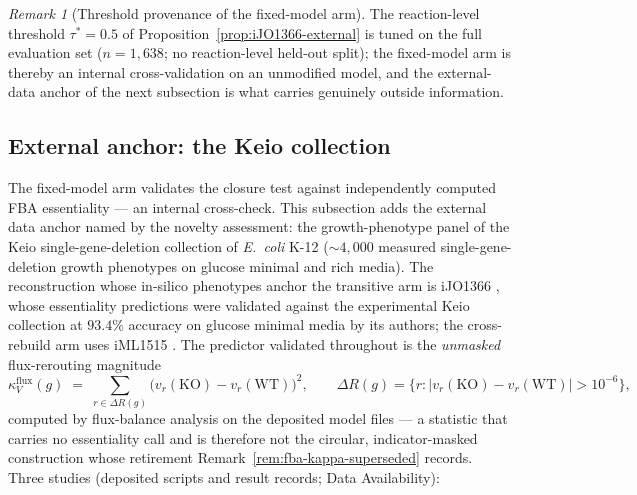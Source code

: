 \documentclass[11pt,a4paper]{article}
\theoremstyle{plain}
\theoremstyle{definition}
\theoremstyle{remark}
\newtheorem{remark}[theorem]{Remark}
\begin{document}
\begin{remark}[Threshold provenance of the fixed-model arm]
\label{rem:ijo-threshold}
The reaction-level threshold $\tau^{*}=0.5$ of
Proposition~\ref{prop:iJO1366-external} is tuned on the full
evaluation set ($n=1{,}638$; no reaction-level held-out split);
the fixed-model arm is thereby an internal cross-validation on an
unmodified model, and the external-data anchor of the next
subsection is what carries genuinely outside information.
\end{remark}

\subsection{External anchor: the Keio collection}\label{sec:network-keio}

The fixed-model arm validates the closure test against independently
computed FBA essentiality --- an internal cross-check. This
subsection adds the external data anchor named by the novelty
assessment: the growth-phenotype panel of the Keio
single-gene-deletion collection of \emph{E.~coli} K-12
\citep{baba2006keio} ($\sim4{,}000$ measured single-gene-deletion
growth phenotypes on glucose minimal and rich media). The
reconstruction whose in-silico phenotypes anchor the transitive arm
is iJO1366 \citep{orth2011ijo1366}, whose essentiality predictions
were validated against the experimental Keio collection at
$93.4\%$ accuracy on glucose minimal media by its authors; the
cross-rebuild arm uses iML1515 \citep{monk2017iml1515}. The
predictor validated throughout is the \emph{unmasked} flux-rerouting
magnitude
\[
  \kappa^{\mathrm{flux}}_V(g) \;=\; \textstyle\sum_{r\in\Delta R(g)}
  \bigl(v_r(\mathrm{KO})-v_r(\mathrm{WT})\bigr)^{2},
  \qquad
  \Delta R(g)=\{r : |v_r(\mathrm{KO})-v_r(\mathrm{WT})|>10^{-6}\},
\]
computed by flux-balance analysis on the deposited model files --- a statistic that
carries no essentiality call and is therefore not the circular,
indicator-masked construction whose retirement
Remark~\ref{rem:fba-kappa-superseded} records. Three studies
(deposited scripts and result records; Data Availability):
\end{document}
